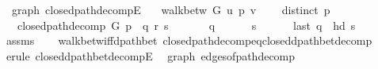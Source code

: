 \begin{isabellebody}
%
\endisadeliminvisible
%
\isataginvisible
{}\isamarkupfalse%
\ {\isacharparenleft}{\kern0pt}\ graph{\isacharparenright}{\kern0pt}\ closed{\isacharunderscore}{\kern0pt}path{\isacharunderscore}{\kern0pt}decompE{\isacharunderscore}{\kern0pt}{}{\isacharcolon}{\kern0pt}\isanewline
\ \ \ {\isachardoublequoteopen}walk{\isacharunderscore}{\kern0pt}betw\ G\ u\ p\ v{\isachardoublequoteclose}\isanewline
\ \ \ {\isachardoublequoteopen}{\isasymnot}\ distinct\ p{\isachardoublequoteclose}\isanewline
\ \ \ {\isachardoublequoteopen}closed{\isacharunderscore}{\kern0pt}path{\isacharunderscore}{\kern0pt}decomp\ G\ p\ {\isacharequal}{\kern0pt}\ {\isacharparenleft}{\kern0pt}q{\isacharcomma}{\kern0pt}\ r{\isacharcomma}{\kern0pt}\ s{\isacharparenright}{\kern0pt}{\isachardoublequoteclose}\isanewline
\ \ \isanewline
\ \ \ \ {\isachardoublequoteopen}q\ {\isasymnoteq}\ {\isacharbrackleft}{\kern0pt}{\isacharbrackright}{\kern0pt}{\isachardoublequoteclose}\isanewline
\ \ \ \ {\isachardoublequoteopen}s\ {\isasymnoteq}\ {\isacharbrackleft}{\kern0pt}{\isacharbrackright}{\kern0pt}{\isachardoublequoteclose}\isanewline
\ \ \ \ {\isachardoublequoteopen}last\ q\ {\isacharequal}{\kern0pt}\ hd\ s{\isachardoublequoteclose}%
\endisataginvisible
{\isafoldinvisible}%
%
\isadeliminvisible
\isanewline
%
\endisadeliminvisible
%
\isadelimproof
\ \ %
\endisadelimproof
%
\isatagproof
{}\isamarkupfalse%
\ assms\isanewline
\ \ \isamarkupfalse%
\ walk{\isacharunderscore}{\kern0pt}betw{\isacharunderscore}{\kern0pt}iff{\isacharunderscore}{\kern0pt}dpath{\isacharunderscore}{\kern0pt}bet\ closed{\isacharunderscore}{\kern0pt}path{\isacharunderscore}{\kern0pt}decomp{\isacharunderscore}{\kern0pt}eq{\isacharunderscore}{\kern0pt}closed{\isacharunderscore}{\kern0pt}dpath{\isacharunderscore}{\kern0pt}bet{\isacharunderscore}{\kern0pt}decomp\isanewline
\ \ \isamarkupfalse%
\ {\isacharparenleft}{\kern0pt}erule\ closed{\isacharunderscore}{\kern0pt}dpath{\isacharunderscore}{\kern0pt}bet{\isacharunderscore}{\kern0pt}decompE{\isacharunderscore}{\kern0pt}{}{\isacharparenright}{\kern0pt}%
\endisatagproof
{\isafoldproof}%
%
\isadelimproof
\isanewline
%
\endisadelimproof
%
\isadeliminvisible
\isanewline
%
\endisadeliminvisible
%
\isataginvisible
{}\isamarkupfalse%
\ {\isacharparenleft}{\kern0pt}\ graph{\isacharparenright}{\kern0pt}\ edges{\isacharunderscore}{\kern0pt}of{\isacharunderscore}{\kern0pt}path{\isacharunderscore}{\kern0pt}decomp{\isacharcolon}{\kern0pt}\isanewline

\end{isabellebody}
